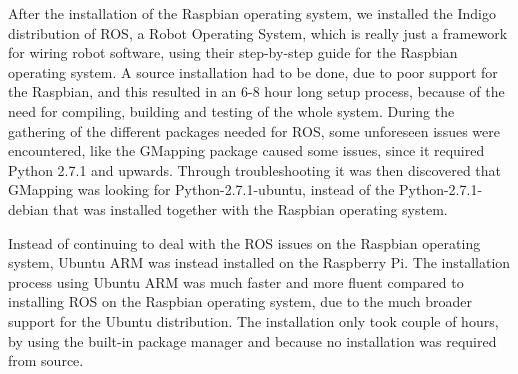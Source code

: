After the installation of the Raspbian operating system, we installed the Indigo distribution of ROS, a Robot Operating System, which is really just a framework for wiring robot software, using their step-by-step guide for the Raspbian operating system.\cite{indigoins}
A source installation had to be done, due to poor support for the Raspbian, and this resulted in an 6-8 hour long setup process, because of the need for compiling, building and testing of the whole system. 
During the gathering of the different packages needed for ROS, some unforeseen issues were encountered, like the GMapping package caused some issues, since it required Python 2.7.1 and upwards. Through troubleshooting it was then discovered that GMapping was looking for Python-2.7.1-ubuntu, instead of the Python-2.7.1-debian that was installed together with the Raspbian operating system.

Instead of continuing to deal with the ROS issues on the Raspbian operating system, Ubuntu ARM was instead installed on the Raspberry Pi.\cite{ubuntuins}
The installation process using Ubuntu ARM was much faster and more fluent compared to installing ROS on the Raspbian operating system, due to the much broader support for the Ubuntu distribution. The installation only took couple of hours, by using the built-in package manager and because no installation was required from source.\cite{ubuntuROS}

